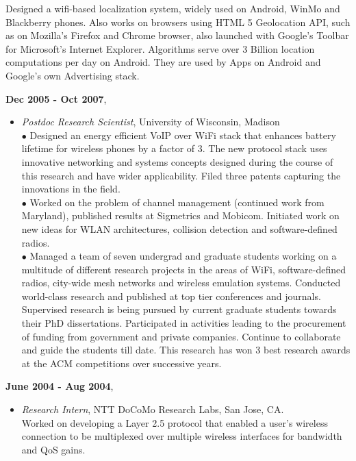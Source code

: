 \begin{resume}
\begin{itemize}
	 Designed a wifi-based localization system, widely used on Android, WinMo and
	 Blackberry phones. Also works on browsers using HTML 5 Geolocation API, such
	 as on Mozilla's Firefox and Chrome browser, also
	 launched with Google's Toolbar for Microsoft's Internet Explorer. Algorithms serve over 3 Billion location
            computations per day on Android. They are used by Apps on Android and Google's own Advertising stack.

    \end{itemize}

{\bf Dec 2005 - Oct 2007},
    \begin{itemize}
         \item[] {\it Postdoc Research Scientist}, University of Wisconsin, Madison\\
	        $\bullet$ Designed an energy efficient VoIP over WiFi stack that
		enhances battery lifetime for wireless phones by a factor of 3.
		The new protocol stack uses innovative networking and systems
		concepts designed during the course of this research and have
		wider applicability. Filed three patents capturing the
		innovations in the field.\\
		$\bullet$ Worked on the problem of channel management (continued work from Maryland), published
		results at Sigmetrics and Mobicom. Initiated work on new ideas for WLAN architectures, collision detection and software-defined radios.\\
                $\bullet$ Managed a team of seven undergrad and graduate students working on a multitude of different research
projects  in the areas of WiFi, software-defined radios, city-wide mesh
networks and wireless emulation systems. Conducted world-class research and
published at top tier conferences and journals. Supervised research is being
pursued by current graduate students towards their PhD dissertations. Participated in activities
leading to the procurement of funding from government and private companies. Continue to collaborate and guide the
students till date. This research has won 3 best research awards at the ACM competitions over successive years.
    \end{itemize}

 {\bf June 2004 - Aug 2004},   	
    \begin{itemize}
         \item[] {\it Research Intern},  NTT DoCoMo Research Labs, San Jose, CA.\\
		 Worked on developing a Layer 2.5 protocol that enabled a user's wireless connection to be
                 multiplexed over multiple wireless interfaces for bandwidth and QoS gains.
		 

\end{itemize}
\end{resume}
